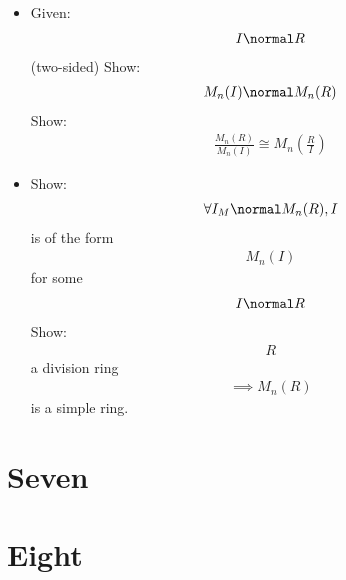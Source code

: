 \begin{enumerate}
  \begin{itemize}
  \tightlist
  \item
    Given: \begin{align*}
    I \normal R\end{align*}
     (two-sided) Show: \begin{align*}
    M_n(I) \normal M_n(R)\end{align*}
     Show: \begin{align*}
    \frac{M_n(R)}{M_n(I)} \cong M_n(\frac{R}{I})\end{align*}
  \item
    Show: \begin{align*}
    \forall I_M \normal M_n(R), I\end{align*}
     is of the form \begin{align*}
    M_n(I)\end{align*}
     for some \begin{align*}
    I \normal R\end{align*}
     Show: \begin{align*}
    R\end{align*}
     a division ring \begin{align*}
    \implies M_n(R)\end{align*}
     is a simple ring.
  \end{itemize}
\end{enumerate}

\hypertarget{seven}{%
\section{Seven}\label{seven}}

\hypertarget{eight}{%
\section{Eight}\label{eight}}





